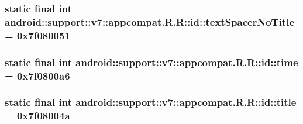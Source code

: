 \hypertarget{classandroid_1_1support_1_1v7_1_1appcompat_1_1_r_1_1id_5a7e23765f000b6b1c938616914503ab}{
\subsubsection[{textSpacerNoTitle}]{\setlength{\rightskip}{0pt plus 5cm}static final int android::support::v7::appcompat.R.R::id::textSpacerNoTitle = 0x7f080051}}
\label{classandroid_1_1support_1_1v7_1_1appcompat_1_1_r_1_1id_5a7e23765f000b6b1c938616914503ab}


\hypertarget{classandroid_1_1support_1_1v7_1_1appcompat_1_1_r_1_1id_260dfdef0e8e961b031ef9297607ccbf}{
\subsubsection[{time}]{\setlength{\rightskip}{0pt plus 5cm}static final int android::support::v7::appcompat.R.R::id::time = 0x7f0800a6}}
\label{classandroid_1_1support_1_1v7_1_1appcompat_1_1_r_1_1id_260dfdef0e8e961b031ef9297607ccbf}


\hypertarget{classandroid_1_1support_1_1v7_1_1appcompat_1_1_r_1_1id_3320d83e67bee02a082d00a9a83bfd22}{
\subsubsection[{title}]{\setlength{\rightskip}{0pt plus 5cm}static final int android::support::v7::appcompat.R.R::id::title = 0x7f08004a}}
\label{classandroid_1_1support_1_1v7_1_1appcompat_1_1_r_1_1id_3320d83e67bee02a082d00a9a83bfd22}


